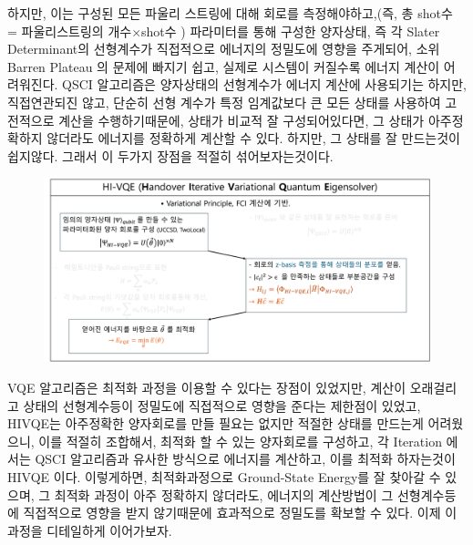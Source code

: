 \documentclass[10pt]{article}
\begin{document}
하지만, 이는 구성된 모든 파울리 스트링에 대해 회로를 측정해야하고,(즉, 총 shot수 = 파울리스트링의 개수\(\times\)shot수 )
파라미터를 통해 구성한 양자상태, 즉 각 Slater Determinant의 선형계수가 직접적으로 에너지의 정밀도에 영향을 주게되어, 소위 Barren Plateau 의 문제에 빠지기 쉽고, 실제로 시스템이 커질수록 에너지 계산이 어려워진다. 
QSCI 알고리즘은 양자상태의 선형계수가 에너지 계산에 사용되기는 하지만, 직접연관되진 않고, 단순히 선형 계수가 특정 임계값보다 큰 모든 상태를 사용하여 고전적으로 계산을 수행하기때문에, 
상태가 비교적 잘 구성되어있다면, 그 상태가 아주정확하지 않더라도 에너지를 정확하게 계산할 수 있다. 하지만, 그 상태를 잘 만드는것이 쉽지않다. 
그래서 이 두가지 장점을 적절히 섞어보자는것이다.
\begin{figure}[H]
  \centering
  \includegraphics[width=\textwidth]{fig/HIVQE_table.png}
  \label{fig:example2}
\end{figure}
VQE 알고리즘은 최적화 과정을 이용할 수 있다는 장점이 있었지만, 계산이 오래걸리고 상태의 선형계수등이 정밀도에 직접적으로 영향을 준다는 제한점이 있었고, 
HIVQE는 아주정확한 양자회로를 만들 필요는 없지만 적절한 상태를 만드는게 어려웠으니, 
이를 적절히 조합해서, 최적화 할 수 있는 양자회로를 구성하고, 각 Iteration 에서는 QSCI 알고리즘과 유사한 방식으로 에너지를 계산하고, 이를 최적화 하자는것이 HIVQE 이다. 
이렇게하면, 최적화과정으로 Ground-State Energy를 잘 찾아갈 수 있으며, 그 최적화 과정이 아주 정확하지 않더라도, 에너지의 계산방법이 그 선형계수등에 직접적으로 영향을 받지 않기때문에
효과적으로 정밀도를 확보할 수 있다. 이제 이 과정을 디테일하게 이어가보자. 
\end{document}
